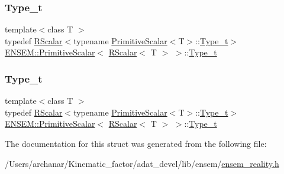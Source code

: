 \subsubsection{\texorpdfstring{Type\_t}{Type\_t}\hspace{0.1cm}{\footnotesize\ttfamily [1/2]}}
{\footnotesize\ttfamily template$<$class T $>$ \\
typedef \mbox{\hyperlink{classENSEM_1_1RScalar}{R\+Scalar}}$<$typename \mbox{\hyperlink{structENSEM_1_1PrimitiveScalar}{Primitive\+Scalar}}$<$T$>$\+::\mbox{\hyperlink{structENSEM_1_1PrimitiveScalar_3_01RScalar_3_01T_01_4_01_4_af25173576e04e62938a35f7747631b4f}{Type\+\_\+t}}$>$ \mbox{\hyperlink{structENSEM_1_1PrimitiveScalar}{E\+N\+S\+E\+M\+::\+Primitive\+Scalar}}$<$ \mbox{\hyperlink{classENSEM_1_1RScalar}{R\+Scalar}}$<$ T $>$ $>$\+::\mbox{\hyperlink{structENSEM_1_1PrimitiveScalar_3_01RScalar_3_01T_01_4_01_4_af25173576e04e62938a35f7747631b4f}{Type\+\_\+t}}}

\mbox{\label{structENSEM_1_1PrimitiveScalar_3_01RScalar_3_01T_01_4_01_4_af25173576e04e62938a35f7747631b4f}} 
\subsubsection{\texorpdfstring{Type\_t}{Type\_t}\hspace{0.1cm}{\footnotesize\ttfamily [2/2]}}
{\footnotesize\ttfamily template$<$class T $>$ \\
typedef \mbox{\hyperlink{classENSEM_1_1RScalar}{R\+Scalar}}$<$typename \mbox{\hyperlink{structENSEM_1_1PrimitiveScalar}{Primitive\+Scalar}}$<$T$>$\+::\mbox{\hyperlink{structENSEM_1_1PrimitiveScalar_3_01RScalar_3_01T_01_4_01_4_af25173576e04e62938a35f7747631b4f}{Type\+\_\+t}}$>$ \mbox{\hyperlink{structENSEM_1_1PrimitiveScalar}{E\+N\+S\+E\+M\+::\+Primitive\+Scalar}}$<$ \mbox{\hyperlink{classENSEM_1_1RScalar}{R\+Scalar}}$<$ T $>$ $>$\+::\mbox{\hyperlink{structENSEM_1_1PrimitiveScalar_3_01RScalar_3_01T_01_4_01_4_af25173576e04e62938a35f7747631b4f}{Type\+\_\+t}}}



The documentation for this struct was generated from the following file\+:\begin{DoxyCompactItemize}
\item 
/\+Users/archanar/\+Kinematic\+\_\+factor/adat\+\_\+devel/lib/ensem/\mbox{\hyperlink{lib_2ensem_2ensem__reality_8h}{ensem\+\_\+reality.\+h}}\end{DoxyCompactItemize}

